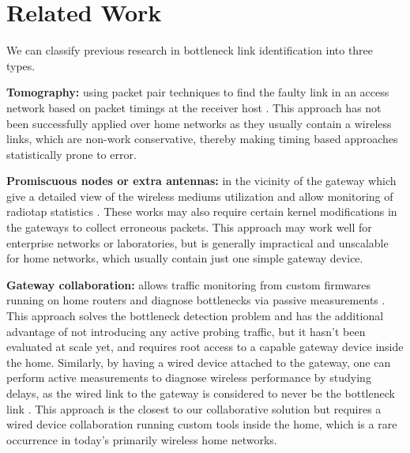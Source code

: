 \section{Related Work}


We can classify previous research in bottleneck link identification into three types.

\textbf{Tomography:} using packet pair techniques to find the faulty link in an access network based on packet timings at the receiver host \cite{tools}. This approach has not been successfully applied over home networks as they usually contain a wireless links, which are non-work conservative, thereby making timing based approaches statistically prone to error.

\textbf{Promiscuous nodes or extra antennas:} in the vicinity of the gateway which give a detailed view of the wireless mediums utilization and allow monitoring of radiotap statistics \cite{wise}. These works may also require certain kernel modifications in the gateways to collect erroneous packets. This approach may work well for enterprise networks or laboratories, but is generally impractical and unscalable for home networks, which usually contain just one simple gateway device. 

\textbf{Gateway collaboration:} allows traffic monitoring from custom firmwares running on home routers and diagnose bottlenecks via passive measurements \cite{wtf}. This approach solves the bottleneck detection problem and has the additional advantage of not introducing any active probing traffic, but it hasn’t been evaluated at scale yet, and requires root access to a capable gateway device inside the home. Similarly, by having a wired device attached to the gateway, one can perform active measurements to diagnose wireless performance by studying delays, as the wired link to the gateway is considered to never be the bottleneck link \cite{wlanprobe}. This approach is the closest to our collaborative solution but requires a wired device collaboration running custom tools inside the home, which is a rare occurrence in today's primarily wireless home networks.